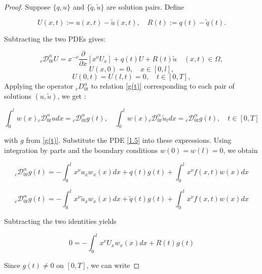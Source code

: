 \documentclass[reqno]{amsart}
\theoremstyle{definition}
\numberwithin{equation}{section}
\begin{document}
\begin{proof}    
 Suppose $\{q, u\}$ and $\{\tilde{q}, \tilde{u}\}$ are solution pairs. Define

$$
U(x, t):=u(x, t)-\tilde{u}(x, t), \quad R(t):=q(t)-\tilde{q}(t) .
$$


Subtracting the two PDEs gives:

\begin{equation}\label{4.6}
    _{c}\mathcal{D}_{0t}^{\alpha}U =x^{-\nu}\frac{\partial}{\partial x}\left[x^{\nu}U_x\right]+q(t)U+R(t)\tilde{u} \quad(x, t) \in \Omega, 
\end{equation}
\begin{equation*}
    U(x, 0)  =0, \quad x \in[0, l], 
\end{equation*}
\begin{equation*}
    U(0, t)  =U(l, t)=0, \quad t \in[0, T],
\end{equation*}
Applying the operator ${_c}D_{0t}^{\alpha}$ to relation \eqref{g(t)} corresponding to each pair of solutions $(u,\tilde{u})$, we get :

\begin{equation*}
    \int_0^l  w(x){_c}\mathcal{D}_{0t}^{\alpha}u d x={_c}\mathcal{D}_{0t}^{\alpha}g(t), \quad \int_0^l w(x){_c}\mathcal{D}_{0t}^{\alpha}\tilde{u}_t  d x={_c}\mathcal{D}_{0t}^{\alpha}g(t),\quad t \in[0, T]
\end{equation*}

with $g$ from \eqref{g(t)}.
Substitute the PDE \eqref{1.5} into these expressions. Using integration by parts and the boundary conditions $w(0)=w(l)=0$, we obtain 


\begin{equation*}
    {_c}\mathcal{D}_{0t}^{\alpha}g(t)=-\int_0^l x^{\nu}u_{x} w_x(x) d x+q(t)g(t)+\int_0^l x^{\nu}f(x,t) w(x) d x 
\end{equation*}

\begin{equation*}
     {_c}\mathcal{D}_{0t}^{\alpha}g(t)=-\int_0^l x^{\nu}\tilde{u}_{x} w_x(x) d x+\tilde{q}(t)g(t)+\int_0^l x^{\nu}f(x,t) w(x) d x 
\end{equation*}



Subtracting the two identities yields

\begin{equation*}
    0=-\int_0^l x^{\nu}U_{x}w_x(x)dx+R(t)g(t)
\end{equation*}

Since $g(t) \neq 0$ on $[0, T]$, we can write


\end{proof}
\end{document}
